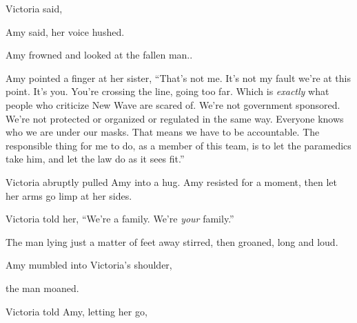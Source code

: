 

 Victoria said, 

 Amy said, her voice hushed.


Amy frowned and looked at the fallen man..


Amy pointed a finger at her sister, “That's not me. It's not my fault we're at this point. It's you. You're crossing the line, going too far. Which is {\em exactly} what people who criticize New Wave are scared of. We're not government sponsored. We're not protected or organized or regulated in the same way. Everyone knows who we are under our masks. That means we have to be accountable. The responsible thing for me to do, as a member of this team, is to let the paramedics take him, and let the law do as it sees fit.”

Victoria abruptly pulled Amy into a hug. Amy resisted for a moment, then let her arms go limp at her sides.

 Victoria told her, “We're a family. We're {\em your} family.”

The man lying just a matter of feet away stirred, then groaned, long and loud.

 Amy mumbled into Victoria's shoulder, 

 the man moaned.

 Victoria told Amy, letting her go, 

